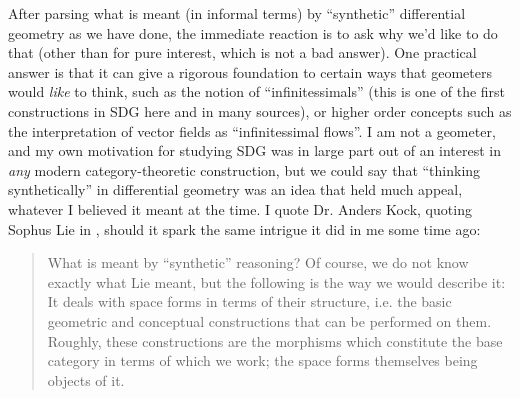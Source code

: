After parsing what is meant (in informal terms) by ``synthetic'' differential geometry as we have done, the immediate reaction is to ask why we'd like to do that (other than for pure interest, which is not a bad answer). One practical answer is that it can give a rigorous foundation to certain ways that geometers would \emph{like} to think, such as the notion of ``infinitessimals'' (this is one of the first constructions in SDG here and in many sources), or higher order concepts such as the interpretation of vector fields as ``infinitessimal flows''. I am not a geometer, and my own motivation for studying SDG was in large part out of an interest in \emph{any} modern category-theoretic construction, but we could say that ``thinking synthetically'' in differential geometry was an idea that held much appeal, whatever I believed it meant at the time. I quote Dr. Anders Kock, quoting Sophus Lie in \cite{kock06}, should it spark the same intrigue it did in me some time ago:
\begin{quote}
  What is meant by “synthetic” reasoning? Of course, we do not know exactly what Lie meant, but the following is the way we would describe it: It deals with space forms in terms of their structure, i.e. the basic geometric and conceptual constructions that can be performed on them. Roughly, these constructions are the morphisms which constitute the base category in terms of which we work; the space forms themselves being objects of it.
\end{quote}
